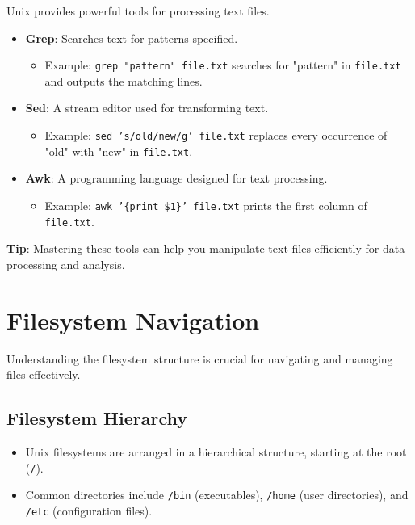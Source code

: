 \documentclass[12pt]{article}
\begin{document}
Unix provides powerful tools for processing text files.

\begin{itemize}
    \item \textbf{Grep}: Searches text for patterns specified.
    \begin{itemize}
        \item Example: \texttt{grep "pattern" file.txt} searches for "pattern" in \texttt{file.txt} and outputs the matching lines.
    \end{itemize}
    
    \item \textbf{Sed}: A stream editor used for transforming text.
    \begin{itemize}
        \item Example: \texttt{sed 's/old/new/g' file.txt} replaces every occurrence of "old" with "new" in \texttt{file.txt}.
    \end{itemize}
    
    \item \textbf{Awk}: A programming language designed for text processing.
    \begin{itemize}
        \item Example: \texttt{awk '\{print \$1\}' file.txt} prints the first column of \texttt{file.txt}.
    \end{itemize}
\end{itemize}

\noindent \textbf{Tip}: Mastering these tools can help you manipulate text files efficiently for data processing and analysis.

\section{Filesystem Navigation}

Understanding the filesystem structure is crucial for navigating and managing files effectively.

\subsection{Filesystem Hierarchy}
\begin{itemize}
    \item Unix filesystems are arranged in a hierarchical structure, starting at the root (\texttt{/}).
    \item Common directories include \texttt{/bin} (executables), \texttt{/home} (user directories), and \texttt{/etc} (configuration files).
\end{itemize}
\end{document}
